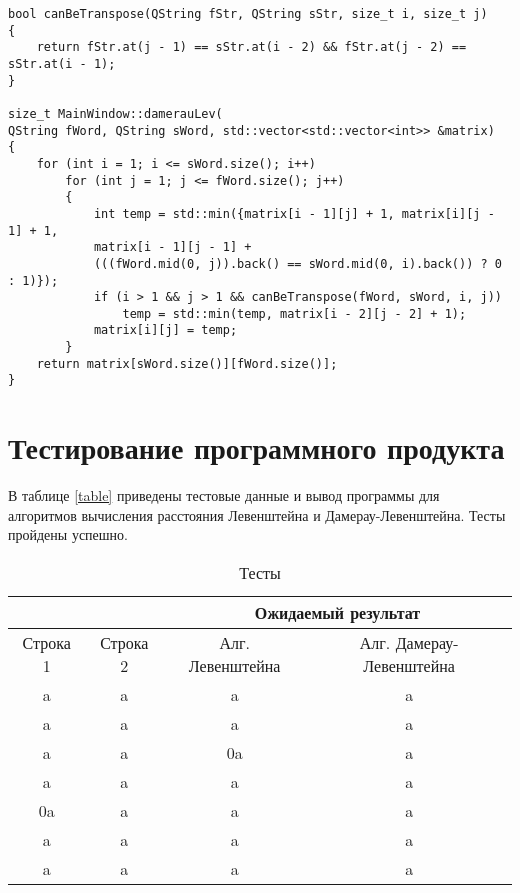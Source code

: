 \documentclass[12pt]{report}
\begin{document}
\begin{lstlisting}[label=some-code,caption=Функция реализации алгоритма Дамерау-Левенштейна]
bool canBeTranspose(QString fStr, QString sStr, size_t i, size_t j)
{
    return fStr.at(j - 1) == sStr.at(i - 2) && fStr.at(j - 2) == sStr.at(i - 1);
}

size_t MainWindow::damerauLev(
QString fWord, QString sWord, std::vector<std::vector<int>> &matrix)
{
    for (int i = 1; i <= sWord.size(); i++)
        for (int j = 1; j <= fWord.size(); j++)
        {
            int temp = std::min({matrix[i - 1][j] + 1, matrix[i][j - 1] + 1,
            matrix[i - 1][j - 1] +
            (((fWord.mid(0, j)).back() == sWord.mid(0, i).back()) ? 0 : 1)});
            if (i > 1 && j > 1 && canBeTranspose(fWord, sWord, i, j))
                temp = std::min(temp, matrix[i - 2][j - 2] + 1);
            matrix[i][j] = temp;
        }
    return matrix[sWord.size()][fWord.size()];
}
\end{lstlisting}

\section{Тестирование программного продукта}
В таблице \ref{table} приведены тестовые данные и вывод программы для алгоритмов вычисления расстояния Левенштейна и Дамерау-Левенштейна. Тесты пройдены успешно.

\label{table}
\begin{table}[h]
	\begin{center}
		\caption{\label{tabular:functional_test} Тесты}
		\begin{tabular}{|c|c|c|c|}
	\hline
			                    &                    & \multicolumn{2}{c|}{\bfseries Ожидаемый результат}    \\ \cline{3-4}\hline
	Строка 1& Строка 2 & Алг. Левенштейна & Алг. Дамерау-Левенштейна \\ [0.5ex] 
 	\hline\hline
 	a & a & a & a\\
 	\hline
 	a & a & a & a\\
 	\hline
	a & a & 0a & a\\
	\hline
	a & a & a & a\\
	\hline
	0a & a & a & a\\
	\hline
	a & a & a & a\\
	\hline
	a & a & a & a\\
	\hline
		\end{tabular}
	\end{center}
\end{table}
\end{document}
